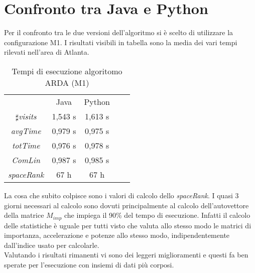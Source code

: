 \section{Confronto tra Java e Python}
Per il confronto tra le due versioni dell'algoritmo si \`e scelto di utilizzare la
configurazione M1. I risultati visibili in tabella sono la media dei vari tempi
rilevati nell'area di Atlanta.
\begin{table}[]
\centering
\caption{Tempi di esecuzione algoritomo ARDA (M1)}
\label{bcmrk_ARDA}
\begin{tabular}{lllll}
\hline
\multicolumn{1}{|c|}{}                        & \multicolumn{1}{|c|}{Java}    & \multicolumn{1}{|c|}{Python} \\
\multicolumn{1}{|c|}{$\sharp$\textit{visits}} & \multicolumn{1}{|c|}{1,543 s} & \multicolumn{1}{|c|}{1,613 s}\\
\multicolumn{1}{|c|}{\textit{avgTime}}        & \multicolumn{1}{|c|}{0,979 s} & \multicolumn{1}{|c|}{0,975 s}\\
\multicolumn{1}{|c|}{\textit{totTime}}        & \multicolumn{1}{|c|}{0,976 s} & \multicolumn{1}{|c|}{0,978 s}\\
\multicolumn{1}{|c|}{\textit{ComLin}}         & \multicolumn{1}{|c|}{0,987 s} & \multicolumn{1}{|c|}{0,985 s}\\
\multicolumn{1}{|c|}{\textit{spaceRank}}     & \multicolumn{1}{|c|}{ 67 h}    & \multicolumn{1}{|c|}{67 h} \\
\hline
\end{tabular}
\end{table}
La cosa che subito colpisce sono i valori di calcolo dello \textit{spaceRank}.
I quasi 3 giorni necessari al calcolo sono dovuti principalmente al calcolo dell'autovettore
della matrice $M_{imp}$ che impiega il 90\% del tempo di esecuzione. Infatti il
calcolo delle statistiche \`e uguale per tutti visto che valuta allo stesso modo le matrici
di importanza, accelerazione e potenze allo stesso modo, indipendentemente dall'indice
usato per calcolarle.\\
Valutando i risultati rimanenti vi sono dei leggeri miglioramenti e questi fa ben sperate
per l'esecuzione con insiemi di dati pi\`u corposi.

